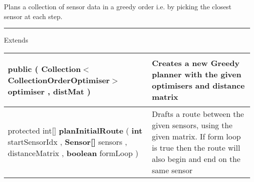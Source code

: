  {\scriptsize Plans a collection of sensor data in a greedy order\newline%
 i.e. by picking the closest sensor at each step.
 
\vspace*{4pt} \hrule \vspace*{3pt}
Extends \textbf{ \hyperref[tab:BaseCollectionOrderPlanner]{\color{blue}{BaseCollectionOrderPlanner}} }
\vspace*{-5pt} 
\begin{tabularx}{\linewidth}{X|m{}}
\label{tab:GreedyCollectionOrderPlanner}
\begin{raggedleft}public  \textbf{\hyperref[tab:GreedyCollectionOrderPlanner]{\color{blue}{GreedyCollectionOrderPlanner}} }(\newline \hfill 
\hspace*{ 5pt} \textbf{Collection$<$CollectionOrderOptimiser$>$} optimiser , \newline
 \hspace*{ 5pt} \textbf{\hyperref[tab:DistanceMatrix]{\color{blue}{DistanceMatrix}}} distMat  )
\end{raggedleft} &
 Creates a new Greedy planner with the given optimisers and distance matrix\\ \hline 
\begin{raggedleft}protected int{[}{]} \textbf{planInitialRoute }(\newline \hfill 
\hspace*{ 5pt} \textbf{int} startSensorIdx , \newline
 \hspace*{ 5pt} \textbf{Sensor{[}{]}} sensors , \newline
 \hspace*{ 5pt} \textbf{\hyperref[tab:DistanceMatrix]{\color{blue}{DistanceMatrix}}} distanceMatrix , \newline
 \hspace*{ 5pt} \textbf{boolean} formLoop  )
\end{raggedleft} &
 Drafts a route between the given sensors, using the given matrix. If form loop is true then the route will also begin and end on the same sensor\\\end{tabularx}
}
